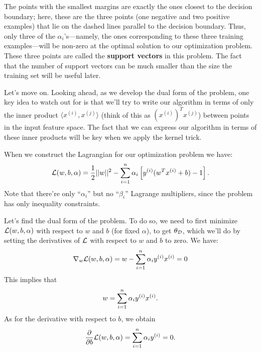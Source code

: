 \documentclass{article}
\begin{document}
The points with the smallest margins are exactly the ones closest to the decision
boundary; here, these are the three points (one negative and two positive examples)
that lie on the dashed lines parallel to the decision boundary.  Thus, only three
of the $\alpha_i$'s---namely, the ones corresponding to these three training examples---will
be non-zero at the optimal solution to our optimization problem.  These three points
are called the {\bf support vectors} in this problem. The fact that the number of
support vectors can be much smaller than the size the training set will be useful later.

Let's move on.  Looking ahead, as we develop the dual form of the problem, one key idea
to watch out for is that we'll try to write our algorithm in terms of only the inner product
$\langle x^{(i)}, x^{(j)} \rangle$ (think of this as $(x^{(i)})^T x^{(j)}$)
between points in the input feature space.  The fact that we can express our algorithm in
terms of these inner products will be key when we apply the kernel trick.

When we construct the Lagrangian for our optimization problem we have:
\begin{equation}
{\cal L}(w,b,\alpha) = \frac{1}{2}||w||^2 - \sum_{i=1}^{n} \alpha_i \left[ {y^{(i)}} ( w^T{x^{(i)}} + b) -1 \right].
			\label{eqn-lagrangian}
\end{equation}
Note that there're only ``$\alpha_i$'' but no ``$\beta_i$'' Lagrange multipliers, since
the problem has only inequality constraints.

Let's find the dual form of the problem.  To do so, we need to first minimize ${\cal L}(w,b,\alpha)$ with
respect to $w$ and $b$ (for fixed $\alpha$), to get $\theta_{\cal D}$, which we'll do by setting the
derivatives of ${\cal L}$ with respect to $w$ and $b$ to zero.  We have:
\[
\nabla_w {\cal L}(w,b,\alpha) = w- \sum_{i=1}^{n} \alpha_i {y^{(i)}} {x^{(i)}} = 0
\]
This implies that
\begin{equation}
w = \sum_{i=1}^{n} \alpha_i {y^{(i)}} {x^{(i)}}.	\label{eqn-wdefinition}
\end{equation}
As for the derivative with respect to $b$, we obtain
\begin{equation}
\frac{\partial}{\partial b} {\cal L}(w,b,\alpha) = \sum_{i=1}^{n} \alpha_i {y^{(i)}} = 0. \label{eqn-bconstraint}
\end{equation}
\end{document}
